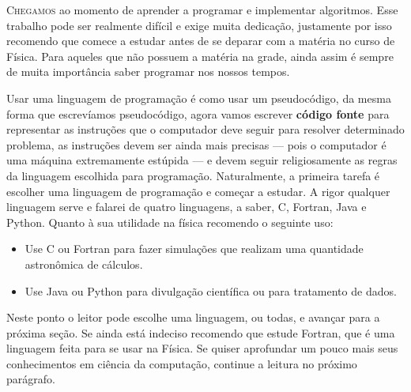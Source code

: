 \lettrine{C}{hegamos} ao momento de aprender a programar e implementar algoritmos.
Esse trabalho pode ser realmente difícil e exige muita dedicação, justamente
por isso recomendo que comece a estudar antes de se deparar com a matéria
no curso de Física. Para aqueles que não possuem a matéria na grade, ainda
assim é sempre de muita importância saber programar nos nossos tempos.

Usar uma linguagem de programação é como usar um pseudocódigo,
da mesma forma que escrevíamos pseudocódigo, agora vamos escrever \textbf{código
fonte} para representar as instruções que o computador deve seguir para resolver
determinado problema, as instruções devem ser ainda mais
precisas --- pois o computador é uma máquina extremamente estúpida --- e
devem seguir religiosamente as regras da linguagem escolhida para programação.
Naturalmente, a primeira tarefa é escolher uma linguagem de programação e
começar a estudar. A rigor qualquer linguagem serve e falarei de quatro linguagens,
a saber, C, Fortran, Java e Python. Quanto à sua utilidade na física recomendo o seguinte uso:
\begin{itemize}[nosep]
\item Use C ou Fortran para fazer simulações que realizam uma quantidade
astronômica de cálculos.
\item Use Java ou Python para divulgação científica ou para tratamento de dados.
\end{itemize}

Neste ponto o leitor pode escolhe uma linguagem, ou todas, e avançar para a
próxima seção. Se ainda está indeciso recomendo que estude Fortran,
que é uma linguagem feita para se usar na Física. Se quiser
aprofundar um pouco mais seus conhecimentos em ciência da computação, continue
a leitura no próximo parágrafo.

